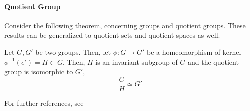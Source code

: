 
\paragraph{Quotient Group}

Consider the following theorem, concerning groups and quotient groups. These results can be generalized to quotient sets and quotient spaces as well. 

\begin{theorem} \label{Theorem_Quotient_Group}
      Let $G, G'$ be two groups. Then, let $\phi: G \rightarrow G'$ be a homeomorphism of kernel $\phi^{-1}(e') = H \subset G$. Then, $H$ is an invariant subgroup of $G$ and the quotient group is isomorphic to $G'$, 
      $$
        \frac{G}{H} \simeq G'
      $$
\end{theorem}

For further references, see \cite{HoracioII}
